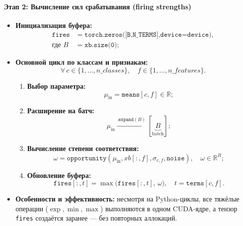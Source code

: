 \paragraph{Этап 2: Вычисление сил срабатывания (firing strengths)}  
\begin{itemize}
  \item {\bf Инициализация буфера:}
  \[
    \begin{split}
      \texttt{fires}
      &= \texttt{torch.zeros([B,N\_TERMS],device=device)}, \\
      \text{где }B &= \texttt{xb.size(0)};
    \end{split}
  \]
  \item {\bf Основной цикл по классам и признакам:}
    \[
      \forall\,c\in\{1,\dots,n\_classes\},\quad
      f\in\{1,\dots,n\_features\}.
    \]
    \begin{enumerate}
      \item {\bf Выбор параметра:}
        \[
          \mu_{\text{in}} = \texttt{means}[c,f]\in\mathbb{R};
        \]
      \item {\bf Расширение на батч:}
        \[
          \mu_{\text{in}}
          \xrightarrow{\texttt{.expand}(B)}
          [\underbrace{B}_{\text{batch}}];
        \]
      \item {\bf Вычисление степени соответствия:}
        \[
          \omega
          = \texttt{opportunity}(
              \mu_{\text{in}},
              xb[:,f],
              \sigma_{c,f},
              \texttt{noise}
            ),
          \quad \omega\in\mathbb{R}^B;
        \]
      \item {\bf Обновление буфера:}
        \[
          \texttt{fires}[:,t]
          = \max\bigl(\texttt{fires}[:,t],\,\omega\bigr),
          \quad t = \texttt{terms}[c,f].
        \]
    \end{enumerate}
  \item {\bf Особенности и эффективность:}  
    несмотря на Python-циклы, все тяжёлые операции (\(\exp,\min,\max\)) выполняются в одном CUDA-ядре,  
    а тензор \texttt{fires} создаётся заранее — без повторных аллокаций.
\end{itemize}

